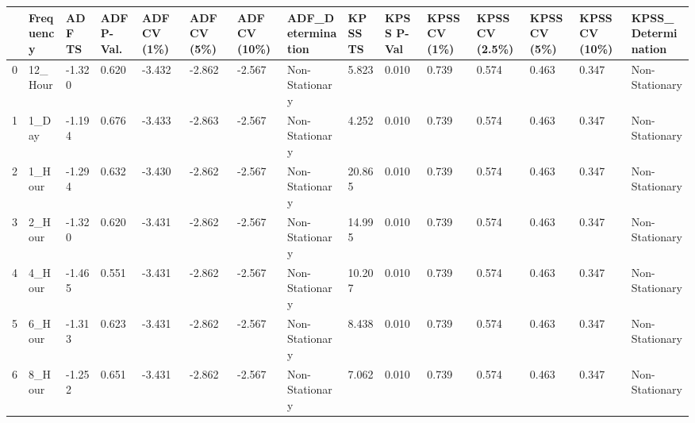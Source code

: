 \begin{tabular}{lllllllllllllll}
\toprule
 & Frequency & ADF TS & ADF P-Val. & ADF CV (1\%) & ADF CV (5\%) & ADF CV (10\%) & ADF_Determination & KPSS TS & KPSS P-Val & KPSS CV (1\%) & KPSS CV (2.5\%) & KPSS CV (5\%) & KPSS CV (10\%) & KPSS_Determination \\
\midrule
0 & 12_Hour & -1.320 & 0.620 & -3.432 & -2.862 & -2.567 & Non-Stationary & 5.823 & 0.010 & 0.739 & 0.574 & 0.463 & 0.347 & Non-Stationary \\
1 & 1_Day & -1.194 & 0.676 & -3.433 & -2.863 & -2.567 & Non-Stationary & 4.252 & 0.010 & 0.739 & 0.574 & 0.463 & 0.347 & Non-Stationary \\
2 & 1_Hour & -1.294 & 0.632 & -3.430 & -2.862 & -2.567 & Non-Stationary & 20.865 & 0.010 & 0.739 & 0.574 & 0.463 & 0.347 & Non-Stationary \\
3 & 2_Hour & -1.320 & 0.620 & -3.431 & -2.862 & -2.567 & Non-Stationary & 14.995 & 0.010 & 0.739 & 0.574 & 0.463 & 0.347 & Non-Stationary \\
4 & 4_Hour & -1.465 & 0.551 & -3.431 & -2.862 & -2.567 & Non-Stationary & 10.207 & 0.010 & 0.739 & 0.574 & 0.463 & 0.347 & Non-Stationary \\
5 & 6_Hour & -1.313 & 0.623 & -3.431 & -2.862 & -2.567 & Non-Stationary & 8.438 & 0.010 & 0.739 & 0.574 & 0.463 & 0.347 & Non-Stationary \\
6 & 8_Hour & -1.252 & 0.651 & -3.431 & -2.862 & -2.567 & Non-Stationary & 7.062 & 0.010 & 0.739 & 0.574 & 0.463 & 0.347 & Non-Stationary \\
\bottomrule
\end{tabular}

